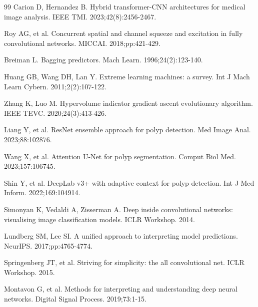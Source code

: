 \documentclass[11pt,a4paper]{article}
\begin{document}
\begin{thebibliography}{99}
 Carion D, Hernandez B. Hybrid transformer-CNN architectures for medical image analysis. IEEE TMI. 2023;42(8):2456-2467.

 Roy AG, et al. Concurrent spatial and channel squeeze and excitation in fully convolutional networks. MICCAI. 2018;pp:421-429.

 Breiman L. Bagging predictors. Mach Learn. 1996;24(2):123-140.

 Huang GB, Wang DH, Lan Y. Extreme learning machines: a survey. Int J Mach Learn Cybern. 2011;2(2):107-122.

 Zhang K, Luo M. Hypervolume indicator gradient ascent evolutionary algorithm. IEEE TEVC. 2020;24(3):413-426.

 Liang Y, et al. ResNet ensemble approach for polyp detection. Med Image Anal. 2023;88:102876.

 Wang X, et al. Attention U-Net for polyp segmentation. Comput Biol Med. 2023;157:106745.

 Shin Y, et al. DeepLab v3+ with adaptive context for polyp detection. Int J Med Inform. 2022;169:104914.

 Simonyan K, Vedaldi A, Zisserman A. Deep inside convolutional networks: visualising image classification models. ICLR Workshop. 2014.

 Lundberg SM, Lee SI. A unified approach to interpreting model predictions. NeurIPS. 2017;pp:4765-4774.

 Springenberg JT, et al. Striving for simplicity: the all convolutional net. ICLR Workshop. 2015.

 Montavon G, et al. Methods for interpreting and understanding deep neural networks. Digital Signal Process. 2019;73:1-15.

\end{thebibliography}
\end{document}
